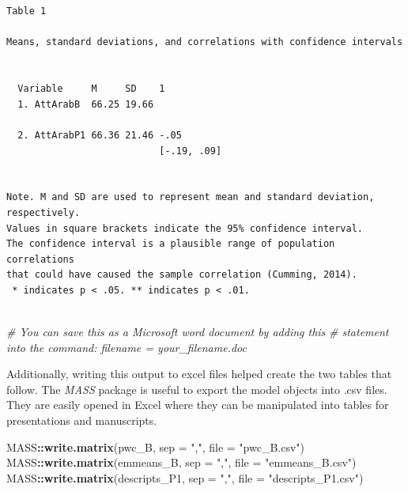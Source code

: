 \documentclass[
  11pt,
]{book}
\newenvironment{Shaded}{\begin{snugshade}}{\end{snugshade}}
\newcommand{\AttributeTok}[1]{\textcolor[rgb]{0.27,0.27,0.27}{#1}}
\newcommand{\CommentTok}[1]{\textcolor[rgb]{0.37,0.37,0.37}{\textit{#1}}}
\newcommand{\FunctionTok}[1]{\textcolor[rgb]{0.27,0.27,0.27}{\textbf{#1}}}
\newcommand{\NormalTok}[1]{#1}
\newcommand{\SpecialCharTok}[1]{\textcolor[rgb]{0.43,0.43,0.43}{\textbf{#1}}}
\newcommand{\StringTok}[1]{\textcolor[rgb]{0.5,0.5,0.5}{#1}}
\begin{document}
\begin{verbatim}


Table 1 

Means, standard deviations, and correlations with confidence intervals
 

  Variable     M     SD    1          
  1. AttArabB  66.25 19.66            
                                      
  2. AttArabP1 66.36 21.46 -.05       
                           [-.19, .09]
                                      

Note. M and SD are used to represent mean and standard deviation, respectively.
Values in square brackets indicate the 95% confidence interval.
The confidence interval is a plausible range of population correlations 
that could have caused the sample correlation (Cumming, 2014).
 * indicates p < .05. ** indicates p < .01.
 
\end{verbatim}

\begin{Shaded}
\begin{Highlighting}[]
\CommentTok{\# You can save this as a Microsoft word document by adding this}
\CommentTok{\# statement into the command: filename = \textquotesingle{}your\_filename.doc\textquotesingle{}}
\end{Highlighting}
\end{Shaded}

Additionally, writing this output to excel files helped create the two tables that follow. The \emph{MASS} package is useful to export the model objects into .csv files. They are easily opened in Excel where they can be manipulated into tables for presentations and manuscripts.

\begin{Shaded}
\begin{Highlighting}[]
\NormalTok{MASS}\SpecialCharTok{::}\FunctionTok{write.matrix}\NormalTok{(pwc\_B, }\AttributeTok{sep =} \StringTok{","}\NormalTok{, }\AttributeTok{file =} \StringTok{"pwc\_B.csv"}\NormalTok{)}
\NormalTok{MASS}\SpecialCharTok{::}\FunctionTok{write.matrix}\NormalTok{(emmeans\_B, }\AttributeTok{sep =} \StringTok{","}\NormalTok{, }\AttributeTok{file =} \StringTok{"emmeans\_B.csv"}\NormalTok{)}
\NormalTok{MASS}\SpecialCharTok{::}\FunctionTok{write.matrix}\NormalTok{(descripts\_P1, }\AttributeTok{sep =} \StringTok{","}\NormalTok{, }\AttributeTok{file =} \StringTok{"descripts\_P1.csv"}\NormalTok{)}
\end{Highlighting}
\end{Shaded}
\end{document}
